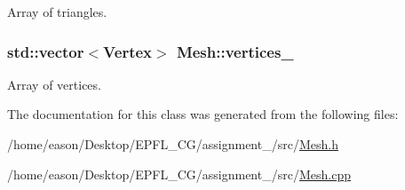 Array of triangles. 

\subsubsection[{\texorpdfstring{vertices\+\_\+}{vertices_}}]{\setlength{\rightskip}{0pt plus 5cm}std\+::vector$<${\bf Vertex}$>$ Mesh\+::vertices\+\_\+\hspace{0.3cm}{\ttfamily [private]}}\hypertarget{classMesh_a986edf1ab1d37e517ff8adc928519528}{}\label{classMesh_a986edf1ab1d37e517ff8adc928519528}


Array of vertices. 



The documentation for this class was generated from the following files\+:\begin{DoxyCompactItemize}
\item 
/home/eason/\+Desktop/\+E\+P\+F\+L\+\_\+\+C\+G/assignment\+\_/src/\hyperlink{Mesh_8h}{Mesh.\+h}\item 
/home/eason/\+Desktop/\+E\+P\+F\+L\+\_\+\+C\+G/assignment\+\_/src/\hyperlink{Mesh_8cpp}{Mesh.\+cpp}\end{DoxyCompactItemize}
